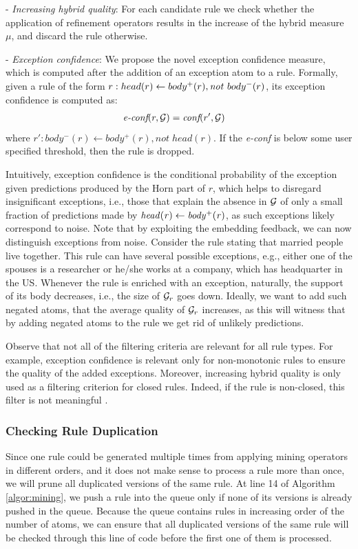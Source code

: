 \noindent- \textit{Increasing hybrid quality}: For each candidate rule we check whether the application of refinement operators results in the increase of the hybrid measure $\mu$, and discard the rule otherwise.

\noindent- \textit{Exception confidence}: We propose the novel exception confidence measure, which is computed after the addition of an exception atom to a rule. Formally, given a rule of the form $r: head(r) \leftarrow body^+(r), \mathit{not}~ body^-(r)$, its exception confidence is computed as:
\begin{align}
	\textit{e-conf}(r,\mathcal{G}) & = \textit{conf}(r',\mathcal{G})
\end{align}
where $r':body^-(r)\leftarrow body^+(r), not\;head(r)$. If the \emph{e-conf} is below some user specified threshold, then the rule is dropped.

Intuitively, exception confidence is the conditional probability of the exception given predictions produced by the Horn part of $r$, which helps to disregard insignificant exceptions, i.e., those that explain the absence in $\mathcal{G}$ of only a small fraction of predictions made by $\mathit{head(r)}\leftarrow \mathit{body^+(r)}$, as such exceptions likely correspond to noise. Note that by exploiting the embedding feedback, we can now distinguish exceptions from noise. 
Consider the rule stating that married people live together. This rule can have several possible exceptions, e.g., either one of the spouses is a researcher or he/she works at a company, which has headquarter in the US. Whenever the rule is enriched with an exception, naturally, the support of its body decreases, i.e., the size of $\mathcal{G}_r$ goes down. Ideally, we want to add such negated atoms, that the average quality of $\mathcal{G}_r$ increases, as this will witness that by adding negated atoms to the rule we get rid of unlikely predictions. 

Observe that not all of the filtering criteria are relevant for all rule types. For example, exception confidence is relevant only for non-monotonic rules to ensure the quality of the added exceptions. Moreover, increasing hybrid quality is only used as a filtering criterion for closed rules. Indeed, if the rule is non-closed, this filter is not meaningful \cite{amie}.

\subsubsection{Checking Rule Duplication}
Since one rule could be generated multiple times from applying mining operators in different orders, and it does not make sense to process a rule more than once, we will prune all duplicated versions of the same rule. At line 14 of Algorithm \ref{algor:mining}, we push a rule into the queue only if none of its versions is already pushed in the queue. Because the queue contains rules in increasing order of the number of atoms, we can ensure that all duplicated versions of the same rule will be checked through this line of code before the first one of them is processed.

